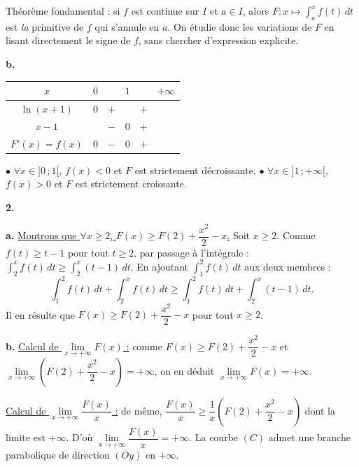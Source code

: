 \documentclass[11pt]{article}
\begin{document}
\begin{rappel}
Théorème fondamental : si $f$ est continue sur $I$ et $a \in I$, alors
$F : x \mapsto \int_a^x f(t)\,dt$ est \emph{la} primitive de $f$ qui
s'annule en $a$. On étudie donc les variations de $F$ en lisant
directement le signe de $f$, sans chercher d'expression explicite.
\end{rappel}

\textbf{b.}
\begin{center}\renewcommand{\arraystretch}{1.4}
\begin{tabular}{|c|ccccc|}
\hline
$x$ & $0$ & & $1$ & & $+\infty$ \\
\hline
$\ln(x+1)$ & $0$ & $+$ & & $+$ & \\
\hline
$x - 1$ & & $-$ & $0$ & $+$ & \\
\hline
$F'(x) = f(x)$ & $0$ & $-$ & $0$ & $+$ & \\
\hline
\end{tabular}
\end{center}
$\bullet$ $\forall x \in ]0\,;1[$, $f(x) < 0$ et $F$ est strictement décroissante. $\bullet$ $\forall x \in ]1\,;+\infty[$, $f(x) > 0$ et $F$ est strictement croissante.

\textbf{2.}

\textbf{a.} \underline{Montrons que $\forall x \ge 2$, $F(x) \ge F(2) + \dfrac{x^2}{2} - x$.} Soit $x \ge 2$. Comme $f(t) \ge t - 1$ pour tout $t \ge 2$, par passage à l'intégrale : $\displaystyle\int_2^x f(t)\,dt \ge \int_2^x (t - 1)\,dt$. En ajoutant $\displaystyle\int_1^2 f(t)\,dt$ aux deux membres :
\[ \int_1^2 f(t)\,dt + \int_2^x f(t)\,dt \ge \int_1^2 f(t)\,dt + \int_2^x (t - 1)\,dt. \]
Il en résulte que $F(x) \ge F(2) + \dfrac{x^2}{2} - x$ pour tout $x \ge 2$.

\textbf{b.} \underline{Calcul de $\lim\limits_{x\to+\infty} F(x)$ :} comme $F(x) \ge F(2) + \dfrac{x^2}{2} - x$ et $\lim\limits_{x\to+\infty}\left(F(2) + \dfrac{x^2}{2} - x\right) = +\infty$, on en déduit $\lim\limits_{x\to+\infty} F(x) = +\infty$.

\underline{Calcul de $\lim\limits_{x\to+\infty}\dfrac{F(x)}{x}$ :} de même, $\dfrac{F(x)}{x} \ge \dfrac{1}{x}\left(F(2) + \dfrac{x^2}{2} - x\right)$ dont la limite est $+\infty$. D'où $\lim\limits_{x\to+\infty}\dfrac{F(x)}{x} = +\infty$. La courbe $(C)$ admet une branche parabolique de direction $(Oy)$ en $+\infty$.
\end{document}

